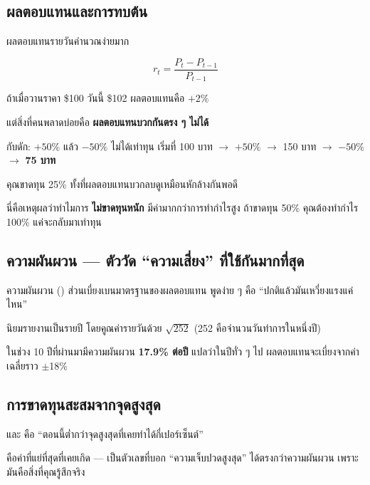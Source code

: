 \documentclass[11pt]{article}
\begin{document}
\subsection{ผลตอบแทนและการทบต้น}

ผลตอบแทนรายวันคำนวณง่ายมาก

\[
r_t = \frac{P_t - P_{t-1}}{P_{t-1}}
\]

ถ้าเมื่อวานราคา \$100 วันนี้ \$102 ผลตอบแทนคือ $+2\%$

แต่สิ่งที่คนพลาดบ่อยคือ \textbf{ผลตอบแทนบวกกันตรง ๆ ไม่ได้}

\begin{trap}{กับดัก: $+50\%$ แล้ว $-50\%$ ไม่ได้เท่าทุน}
เริ่มที่ 100 บาท $\rightarrow$ $+50\%$ $\rightarrow$ 150 บาท $\rightarrow$ $-50\%$ $\rightarrow$ \textbf{75 บาท}

คุณขาดทุน 25\% ทั้งที่ผลตอบแทนบวกลบดูเหมือนหักล้างกันพอดี

นี่คือเหตุผลว่าทำไมการ \textbf{ไม่ขาดทุนหนัก} มีค่ามากกว่าการทำกำไรสูง
ถ้าขาดทุน 50\% คุณต้องทำกำไร 100\% แค่จะกลับมาเท่าทุน
\end{trap}

\subsection{ความผันผวน --- ตัววัด ``ความเสี่ยง'' ที่ใช้กันมากที่สุด}

\begin{term}{ความผันผวน ()}
ส่วนเบี่ยงเบนมาตรฐานของผลตอบแทน พูดง่าย ๆ คือ ``ปกติแล้วมันเหวี่ยงแรงแค่ไหน''

นิยมรายงานเป็นรายปี โดยคูณค่ารายวันด้วย $\sqrt{252}$
(252 คือจำนวนวันทำการในหนึ่งปี)

 ในช่วง 10 ปีที่ผ่านมามีความผันผวน \textbf{17.9\% ต่อปี}
แปลว่าในปีทั่ว ๆ ไป ผลตอบแทนจะเบี่ยงจากค่าเฉลี่ยราว $\pm$18\%
\end{term}

\subsection{การขาดทุนสะสมจากจุดสูงสุด}

\begin{term}{ และ }
 คือ ``ตอนนี้ต่ำกว่าจุดสูงสุดที่เคยทำได้กี่เปอร์เซ็นต์''

 คือค่าที่แย่ที่สุดที่เคยเกิด --- เป็นตัวเลขที่บอก
``ความเจ็บปวดสูงสุด'' ได้ตรงกว่าความผันผวน เพราะมันคือสิ่งที่คุณรู้สึกจริง
\end{term}
\end{document}

